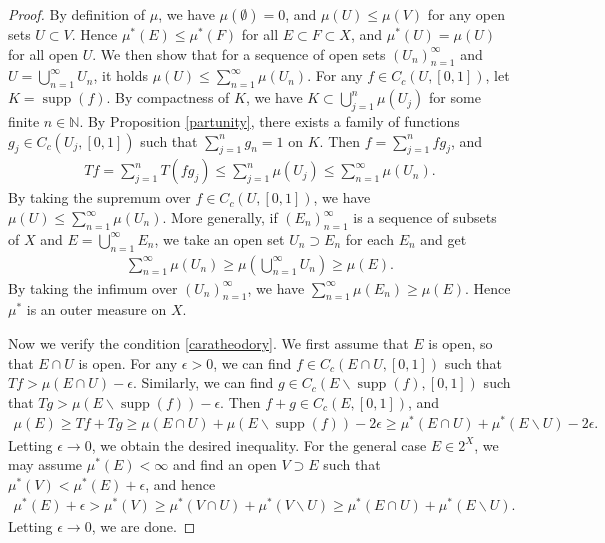 \documentclass{article}
\numberwithin{equation}{section}
\newcommand{\bbN}{\mathbb{N}}
\DeclareMathOperator{\supp}{supp}
\theoremstyle{plain}
\theoremstyle{definition}
\begin{document}
\begin{proof}
	By definition of $\mu$, we have $\mu(\emptyset)=0$, and $\mu(U)\leq\mu(V)$ for any open sets $U\subset V$. Hence $\mu^*(E)\leq\mu^*(F)$ for all $E\subset F\subset X$, and $\mu^*(U)=\mu(U)$ for all open $U$. We then show that for a sequence of open sets $(U_n)_{n=1}^\infty$ and $U=\bigcup_{n=1}^\infty U_n$, it holds $\mu(U)\leq\sum_{n=1}^\infty\mu(U_n)$. For any $f\in C_c(U,[0,1])$, let $K=\supp(f)$. By compactness of $K$, we have $K\subset\bigcup_{j=1}^n\mu(U_j)$ for some finite $n\in\bbN$. By Proposition \ref{partunity}, there exists a family of functions $g_j\in C_c(U_j,[0,1])$ such that $\sum_{j=1}^n g_n=1$ on $K$. Then $f=\sum_{j=1}^n fg_j$, and
	\begin{align*}
		Tf=\sum_{j=1}^n T(fg_j)\leq\sum_{j=1}^n\mu(U_j)\leq \sum_{n=1}^\infty \mu(U_n).
	\end{align*}
	By taking the supremum over $f\in C_c(U,[0,1])$, we have $\mu(U)\leq\sum_{n=1}^\infty \mu(U_n)$. More generally, if $(E_n)_{n=1}^\infty$ is a sequence of subsets of $X$ and $E=\bigcup_{n=1}^\infty E_n$, we take an open set $U_n\supset E_n$ for each $E_n$ and get
	\begin{align*}
		\sum_{n=1}^\infty\mu(U_n)\geq\mu\left(\bigcup_{n=1}^\infty U_n\right)\geq \mu(E).
	\end{align*}
	By taking the infimum over $(U_n)_{n=1}^\infty$, we have $\sum_{n=1}^\infty\mu(E_n)\geq \mu(E)$. Hence $\mu^*$ is an outer measure on $X$.
	
	Now we verify the condition \ref{caratheodory}. We first assume that $E$ is open, so that $E\cap U$ is open. For any $\epsilon>0$, we can find $f\in C_c(E\cap U,[0,1])$ such that $Tf>\mu(E\cap U)-\epsilon$. Similarly, we can find $g\in C_c(E\backslash\supp(f),[0,1])$ such that $Tg>\mu(E\backslash\supp(f))-\epsilon$. Then $f+g\in C_c(E,[0,1])$, and
	\begin{align*}
		\mu(E)\geq Tf+Tg\geq\mu(E\cap U)+\mu(E\backslash\supp(f))-2\epsilon \geq \mu^*(E\cap U)+\mu^*(E\backslash U)-2\epsilon.
	\end{align*}
	Letting $\epsilon\to 0$, we obtain the desired inequality. For the general case $E\in 2^X$, we may assume $\mu^*(E)<\infty$ and find an open $V\supset E$ such that $\mu^*(V)<\mu^*(E)+\epsilon$, and hence
	\begin{align*}
		\mu^*(E)+\epsilon>\mu^*(V)\geq\mu^*(V\cap U)+\mu^*(V\backslash U)\geq\mu^*(E\cap U)+\mu^*(E\backslash U).
	\end{align*}
	Letting $\epsilon\to 0$, we are done.
\end{proof}
\end{document}
